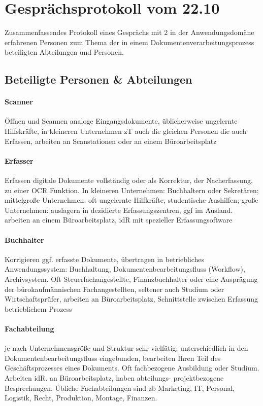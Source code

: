 \documentclass[11pt,oneside,a4paper,notitlepage]{article}
\begin{document}
%
%
%
\section{Gesprächsprotokoll vom 22.10}

Zusammenfassendes Protokoll eines Gesprächs mit 2 in der Anwendungsdomäne erfahrenen Personen zum Thema der in einem Dokumentenverarbeitungsprozess beteiligten Abteilungen und Personen.


\subsection{Beteiligte Personen \& Abteilungen}

\paragraph*{Scanner}
Öffnen und Scannen analoge Eingangsdokumente, üblicherweise ungelernte Hilfskräfte, in kleineren Unternehmen zT auch die gleichen Personen die auch Erfassen, arbeiten an Scanstationen oder an einem Büroarbeitsplatz

\paragraph*{Erfasser}
%
Erfassen digitale Dokumente vollständig oder als Korrektur, der Nacherfassung, zu einer OCR Funktion. In kleineren Unternehmen: Buchhaltern oder Sekretären; mittelgroße Unternehmen: oft ungelernte Hilfkräfte, studentische Aushilfen; große Unternehmen: auslagern in dezidierte Erfassungszentren, ggf im Ausland. arbeiten an einem Büroarbeitsplatz, idR mit spezieller Erfassungsoftware

%
\paragraph*{Buchhalter}
Korrigieren ggf. erfasste Dokumente, übertragen in betriebliches Anwendungssystem: Buchhaltung, Dokumentenbearbeitungsfluss (Workflow), Archivsystem. Oft Steuerfachangestellte, Finanzbuchhalter oder eine Ausprägung der bürokaufmännischen Fachangestellten, seltener auch Studium oder Wirtschaftsprüfer, arbeiten an Büroarbeitsplatz, Schnittstelle zwischen Erfassung betrieblichem Prozess

%
\paragraph*{Fachabteilung}
je nach Unternehmensgröße und Struktur sehr vielfätig, unterschiedlich in den Dokumentenbearbeitungsfluss eingebunden, bearbeiten Ihren Teil des Geschäftsprozesses eines Dokuments. Oft fachbezogene Ausbildung oder Studium. Arbeiten idR. an Büroarbeitsplatz, haben abteilungs- projektbezogene Besprechungen. Übliche Fachabteilungen sind zb Marketing, IT, Personal, Logistik, Recht, Produktion, Montage, Finanzen.
\end{document}
